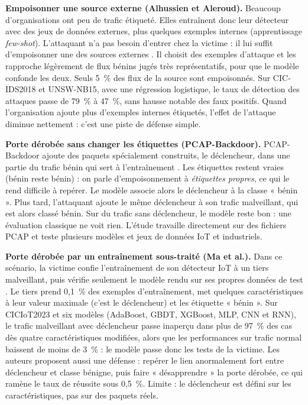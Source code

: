 \documentclass[a4paper,10pt]{article}
\begin{document}
\textbf{Empoisonner une source externe (Alhussien et Aleroud).} Beaucoup
d'organisations ont peu de trafic étiqueté. Elles entraînent donc leur
détecteur avec des jeux de données externes, plus quelques exemples internes
(apprentissage \emph{few-shot}). L'attaquant n'a pas besoin d'entrer chez la
victime : il lui suffit d'empoisonner une des sources externes
\cite{alhussien}. Il choisit des exemples d'attaque et les rapproche
légèrement de flux bénins jugés très représentatifs, pour que le modèle
confonde les deux. Seuls 5~\% des flux de la source sont empoisonnés. Sur
CIC-IDS2018 et UNSW-NB15, avec une régression logistique, le taux de détection
des attaques passe de 79~\% à 47~\%, sans hausse notable des faux positifs.
Quand l'organisation ajoute plus d'exemples internes étiquetés, l'effet de
l'attaque diminue nettement : c'est une piste de défense simple.

\textbf{Porte dérobée sans changer les étiquettes (PCAP-Backdoor).}
PCAP-Backdoor ajoute des paquets spécialement construits, le déclencheur, dans
une partie du trafic bénin qui sert à l'entraînement \cite{backdoor}. Les
étiquettes restent vraies (bénin reste bénin) : on parle d'empoisonnement à
\emph{étiquettes propres}, ce qui le rend difficile à repérer. Le modèle
associe alors le déclencheur à la classe « bénin ». Plus tard, l'attaquant
ajoute le même déclencheur à son trafic malveillant, qui est alors classé
bénin. Sur du trafic sans déclencheur, le modèle reste bon : une évaluation
classique ne voit rien. L'étude travaille directement sur des fichiers PCAP et
teste plusieurs modèles et jeux de données IoT et industriels.

\textbf{Porte dérobée par un entraînement sous-traité (Ma et al.).} Dans ce
scénario, la victime confie l'entraînement de son détecteur IoT à un tiers
malveillant, puis vérifie seulement le modèle rendu sur ses propres données de
test \cite{ma}. Le tiers prend 0,1~\% des exemples d'entraînement, met
quelques caractéristiques à leur valeur maximale (c'est le déclencheur) et
les étiquette « bénin ». Sur CICIoT2023 et six modèles (AdaBoost, GBDT,
XGBoost, MLP, CNN et RNN), le trafic malveillant avec déclencheur passe
inaperçu dans plus de 97~\% des cas dès quatre caractéristiques modifiées,
alors que les performances sur trafic normal baissent de moins de 3~\% : le
modèle passe donc les tests de la victime. Les auteurs proposent aussi une
défense : repérer le lien anormalement fort entre déclencheur et classe
bénigne, puis faire « désapprendre » la porte dérobée, ce qui ramène le taux
de réussite sous 0,5~\%. Limite : le déclencheur est défini sur les
caractéristiques, pas sur des paquets réels.
\end{document}
